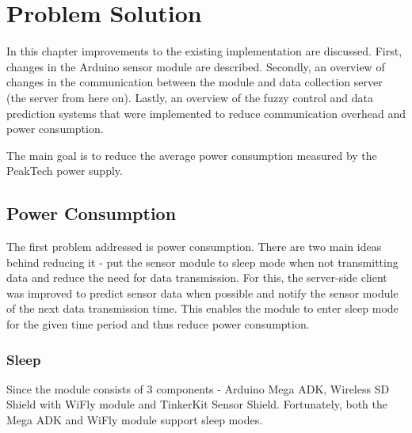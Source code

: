 
\chapter{Problem Solution} %

In this chapter improvements to the existing implementation are discussed. First, changes in the Arduino sensor module are described. Secondly, an overview of changes in the communication between the module and data collection server (the server from here on). Lastly, an overview of the fuzzy control and data prediction systems that were implemented to reduce communication overhead and power consumption.

The main goal is to reduce the average power consumption measured by  the PeakTech power supply. 



\ifpdf
    \graphicspath{{X/figures/PNG/}{X/figures/PDF/}{X/figures/}}
\else
    \graphicspath{{X/figures/EPS/}{X/figures/}}
\fi

\section{Power Consumption}

The first problem addressed is power consumption. There are two main ideas behind reducing it - put the sensor module to sleep mode when not transmitting data and reduce the need for data transmission. For this, the server-side client was improved to predict sensor data when possible and notify the sensor module of the next data transmission time. This enables the module to enter sleep mode for the given time period and thus reduce power consumption. 

\subsection{Sleep}

Since the module consists of 3 components - Arduino Mega ADK, Wireless SD Shield with WiFly module and TinkerKit Sensor Shield. Fortunately, both the Mega ADK and WiFly module support sleep modes. 

